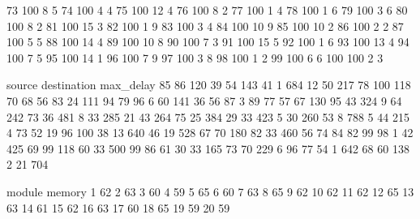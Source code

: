 73        100    8        5
74        100    4        4
75        100    12       4
76        100    8        2
77        100    1        4
78        100    1        6
79        100    3        6
80        100    8        2
81        100    15       3
82        100    1        9
83        100    3        4
84        100    10       9
85        100    10       2
86        100    2        2
87        100    5        5
88        100    14       4
89        100    10       8
90        100    7        3
91        100    15       5
92        100    1        6
93        100    13       4
94        100    7        5
95        100    14       1
96        100    7        9
97        100    3        8
98        100    1        2
99        100    6        6
100       100    2        3

source destination max_delay
85     86          120
39     54          143
41     1           684
12     50          217
78     100         118
70     68          56
83     24          111
94     79          96
6      60          141
36     56          87
3      89          77
57     67          130
95     43          324
9      64          242
73     36          481
8      33          285
21     43          264
75     25          384
29     33          423
5      30          260
53     8           788
5      44          215
4      73          52
19     96          100
38     13          640
46     19          528
67     70          180
82     33          460
56     74          84
82     99          98
1      42          425
69     99          118
60     33          500
99     86          61
30     33          165
73     70          229
6      96          77
54     1           642
68     60          138
2      21          704

module memory
1      62
2      63
3      60
4      59
5      65
6      60
7      63
8      65
9      62
10     62
11     62
12     65
13     63
14     61
15     62
16     63
17     60
18     65
19     59
20     59

